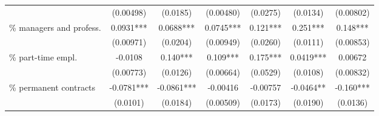 \begin{threeparttable}
\begin{tabular}{l*{6}{S}}
                          &  (0.00498)   & (0.0185)    & (0.00480)  & (0.0275)    & (0.0134)   & (0.00802)    \\[1ex]
\% managers and profess.  &  0.0931***   & 0.0688***   & 0.0745***  & 0.121***    & 0.251***   & 0.148***     \\
                          &  (0.00971)   & (0.0204)    & (0.00949)  & (0.0260)    & (0.0111)   & (0.00853)    \\[1ex]
\% part-time empl.        &  -0.0108     & 0.140***    & 0.109***   & 0.175***    & 0.0419***  & 0.00672      \\
                          &  (0.00773)   & (0.0126)    & (0.00664)  & (0.0529)    & (0.0108)   & (0.00832)    \\[1ex]
\% permanent contracts    &  -0.0781***  & -0.0861***  & -0.00416   & -0.00757    & -0.0464**  & -0.160***    \\
                          &  (0.0101)    & (0.0184)    & (0.00509)  & (0.0173)    & (0.0190)   & (0.0136)     \\[1ex]


\end{tabular}
\end{threeparttable}
